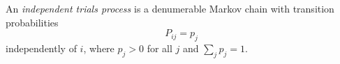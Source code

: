 An \textit{independent trials process} is a denumerable Markov chain with transition probabilities
$$P_{ij} = p_j$$
independently of $i$, where $p_j > 0$ for all $j$ and $\sum_j p_j = 1$.
